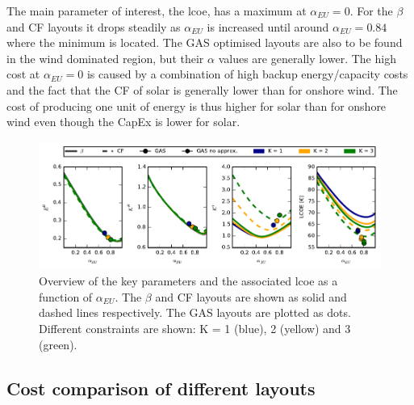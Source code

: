 \documentclass[a4paper, 5p, sort&compress]{elsarticle}%
\begin{document}

The main parameter of interest, the \gls{lcoe}, has a maximum at
$\alpha_{EU} = 0$. For the $\beta$ and CF layouts it drops steadily as
$\alpha_{EU}$ is increased until around $\alpha_{EU} = 0.84$ where the minimum
is located. The GAS optimised layouts are also to be found in the wind
dominated region, but their $\alpha$ values are generally lower. The high
cost at $\alpha_{EU} = 0$ is caused by a combination of high backup
energy/capacity costs and the fact that the CF of solar is generally
lower than for onshore wind. The cost of producing one unit of energy
is thus higher for solar than for onshore wind even though the
\gls{CapEx} is lower for solar.



\begin{figure}[t!]
  \centering
  \includegraphics[width = 2\columnwidth]{dataSync-new}
  \caption{Overview of the key parameters and the associated \gls{lcoe} as a
    function of $\alpha_{EU}$. The $\beta$ %
    and CF %
    layouts are shown as solid and dashed lines respectively. The GAS
    layouts are plotted as dots. Different constraints are shown: K =
    1 (blue), 2 (yellow) and 3 (green).}
  \label{fig:overview}
\end{figure}

\subsection{Cost comparison of different layouts}
\end{document}
